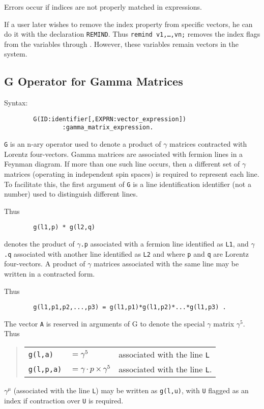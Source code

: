Errors occur if indices are not properly matched in expressions.

\hypertarget{command:REMIND}{}
If a user later wishes to remove the index property from specific vectors,
he can do it with the declaration \texttt{REMIND}. Thus
\texttt{remind v1,\ldots{},vn;} removes the index flags from the variables 
through .  However, these variables remain vectors in the system.

\subsection{G Operator for Gamma Matrices}
\hypertarget{operator:G}{}

Syntax:
\begin{verbatim}
        G(ID:identifier[,EXPRN:vector_expression])
                :gamma_matrix_expression.
\end{verbatim}
\texttt{G} is an n-ary operator used to denote a product of $\gamma$ matrices
contracted with Lorentz four-vectors. Gamma matrices are associated with
fermion lines in a Feynman diagram. If more than one such line occurs,
then a different set of $\gamma$ matrices (operating in independent spin
spaces) is required to represent each line. To facilitate this, the first
argument of \texttt{G} is a line identification identifier (not a number)
used to distinguish different lines.

Thus
\begin{verbatim}
        g(l1,p) * g(l2,q)
\end{verbatim}
denotes the product of \texttt{$\gamma$.p} associated with a fermion line
identified as \texttt{L1}, and \texttt{$\gamma$.q} associated with another line
identified as \texttt{L2} and where \texttt{p} and \texttt{q} are Lorentz
four-vectors.  A product of $\gamma$ matrices associated with the same
line may be written in a contracted form.

Thus
\begin{verbatim}
        g(l1,p1,p2,...,p3) = g(l1,p1)*g(l1,p2)*...*g(l1,p3) .
\end{verbatim}
The vector \texttt{A} is reserved in arguments of G to denote the special
$\gamma$ matrix $\gamma^{5}$. Thus
\begin{quote}
\begin{tabular}{lll}
 \texttt{g(l,a)} & $ = \gamma^{5}$ & associated with the line \texttt{L} \\[0.1in]
 \texttt{g(l,p,a)} & $ = \gamma\cdot p \times \gamma^{5}$ & 
           associated with the line \texttt{L}.
\end{tabular}
\end{quote}
$\gamma^{\mu}$ (associated with the line \texttt{L}) may be written as
\texttt{g(l,u)}, with \texttt{U} flagged as an index if contraction over \texttt{U}
is required.

